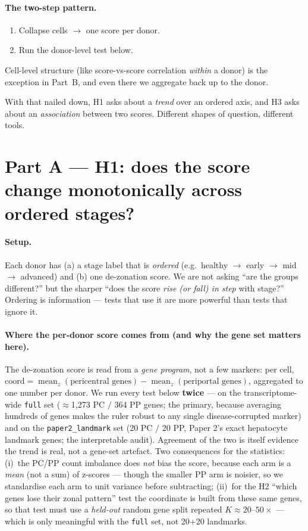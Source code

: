 \documentclass[11pt]{article}
\begin{document}
\paragraph{The two-step pattern.}
\begin{enumerate}[label=(\arabic*),leftmargin=*]
  \item Collapse cells $\rightarrow$ one score per donor.
  \item Run the donor-level test below.
\end{enumerate}
Cell-level structure (like score-vs-score correlation \emph{within} a donor) is the exception in Part~B, and even there we aggregate back up to the donor.

With that nailed down, H1 asks about a \emph{trend} over an ordered axis, and H3 asks about an \emph{association} between two scores. Different shapes of question, different tools.

\section{Part A --- H1: does the score change monotonically across ordered stages?}

\paragraph{Setup.} Each donor has (a) a stage label that is \emph{ordered} (e.g.\ healthy $\rightarrow$ early $\rightarrow$ mid $\rightarrow$ advanced) and (b) one de-zonation score. We are not asking ``are the groups different?'' but the sharper ``does the score \emph{rise (or fall) in step} with stage?'' Ordering is information --- tests that use it are more powerful than tests that ignore it.

\paragraph{Where the per-donor score comes from (and why the gene set matters here).} The de-zonation score is read from a \emph{gene program}, not a few markers: per cell, $\text{coord} = \operatorname{mean}_z(\text{pericentral genes}) - \operatorname{mean}_z(\text{periportal genes})$, aggregated to one number per donor. We run every test below \textbf{twice} --- on the transcriptome-wide \texttt{full} set ($\approx$1{,}273 PC $/$ 364 PP genes; the primary, because averaging hundreds of genes makes the ruler robust to any single disease-corrupted marker) and on the \texttt{paper2\_landmark} set (20 PC $/$ 20 PP, Paper 2's exact hepatocyte landmark genes; the interpretable audit). Agreement of the two is itself evidence the trend is real, not a gene-set artefact. Two consequences for the statistics: (i)~the PC/PP count imbalance does \emph{not} bias the score, because each arm is a \emph{mean} (not a sum) of z-scores --- though the smaller PP arm is noisier, so we standardise each arm to unit variance before subtracting; (ii)~for the H2 ``which genes lose their zonal pattern'' test the coordinate is built from these same genes, so that test must use a \emph{held-out} random gene split repeated $K\!\approx\!20$--$50\times$ --- which is only meaningful with the \texttt{full} set, not 20$+$20 landmarks.
\end{document}
